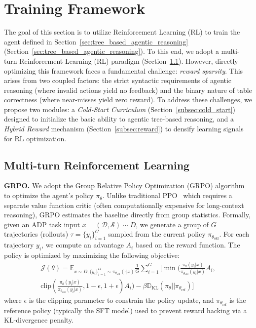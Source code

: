 \section{Training Framework}
\label{sec:agentic_training_framework}

The goal of this section is to utilize Reinforcement Learning (RL) to train the agent defined in Section~\ref{sec:tree_based_agentic_reasoning}(Section~\ref{sec:tree_based_agentic_reasoning}). 
To this end, we adopt a multi-turn Reinforcement Learning (RL) paradigm (Section~\ref{subsec:multi_turn_rl}).
However, directly optimizing this framework faces a fundamental challenge: \textit{reward sparsity}. This arises from two coupled factors: the strict syntactic requirements of agentic reasoning (where invalid actions yield no feedback) and the binary nature of table correctness (where near-misses yield zero reward).
To address these challenges, we propose two modules: a \textit{Cold-Start Curriculum} (Section~\ref{subsec:cold_start}) designed to initialize the basic ability to agentic tree-based reasoning, and a \textit{Hybrid Reward} mechanism (Section~\ref{subsec:reward}) to densify learning signals for RL optimization.

\subsection{Multi-turn Reinforcement Learning}
\label{subsec:multi_turn_rl}

\noindent \textbf{GRPO.} 
We adopt the Group Relative Policy Optimization (GRPO) algorithm~\cite{shao2024deepseekmath} to optimize the agent's policy $\pi_\theta$. Unlike traditional PPO~\cite{schulman2017proximal} which requires a separate value function critic (often computationally expensive for long-context reasoning), GRPO estimates the baseline directly from group statistics.
Formally, given an ADP task input $x = (\mathcal{D}, \mathcal{S}) \sim D$, we generate a group of $G$ trajectories (rollouts) $\tau = \{y_i\}_{i=1}^G$ sampled from the current policy $\pi_{\theta_{\text{old}}}$.
For each trajectory $y_i$, we compute an advantage $A_i$ based on the reward function. The policy is optimized by maximizing the following objective:
\begin{equation}
\begin{split}
\mathcal{J}(\theta) = \mathbb{E}_{x \sim D, \{y_i\}_{i=1}^G \sim \pi_{\theta_{\text{old}}}(\cdot|x)} 
\frac{1}{G} \sum_{i=1}^G \bigg[ \min \bigg( \frac{\pi_\theta(y_i|x)}{\pi_{\theta_{\text{old}}}(y_i|x)} A_i, \\
\text{clip} \left( \frac{\pi_\theta(y_i|x)}{\pi_{\theta_{\text{old}}}(y_i|x)}, 1-\epsilon, 1+\epsilon \right) A_i \bigg) - \beta \mathbb{D}_{\text{KL}} (\pi_\theta || \pi_{\theta_{\text{ref}}}) \bigg]
\end{split}
\end{equation}
where $\epsilon$ is the clipping parameter to constrain the policy update, and $\pi_{\theta_{\text{ref}}}$ is the reference policy (typically the SFT model) used to prevent reward hacking via a KL-divergence penalty.

